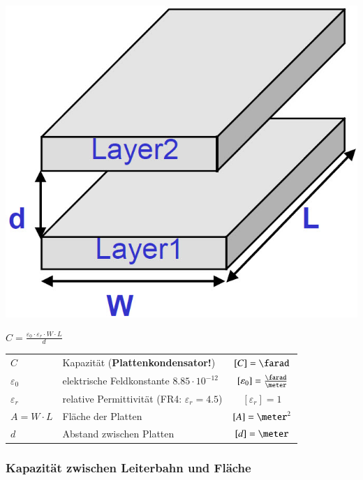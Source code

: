 \begin{minipage}[c]{0.28\columnwidth}
    \includegraphics[width=\columnwidth]{images/leitungen_kapazitaet.jpg}
\end{minipage}
\hfill
\begin{minipage}[c]{0.65\columnwidth}
    $ \boxed{C = \frac{\varepsilon_0 \cdot \varepsilon_r \cdot W \cdot L}{d}} $
\end{minipage}

\begin{tabular}{llc}
    $C$             & Kapazität (\textbf{Plattenkondensator!})          & $[C] = \farad$ \\
    $\varepsilon_0$ & elektrische Feldkonstante $8.85 \cdot 10^{-12}$   & $[\varepsilon_0] = \frac{\farad}{\meter}$ \\
    $\varepsilon_r$ & relative Permittivität (FR4: $\varepsilon_r= 4.5$)& $[\varepsilon_r] = 1$ \\
    $A = W \cdot L$ & Fläche der Platten                                & $[A] = \meter^2$ \\
    $d$             & Abstand zwischen Platten                          & $[d] = \meter$
\end{tabular}


\subsubsection{Kapazität zwischen Leiterbahn und Fläche}

